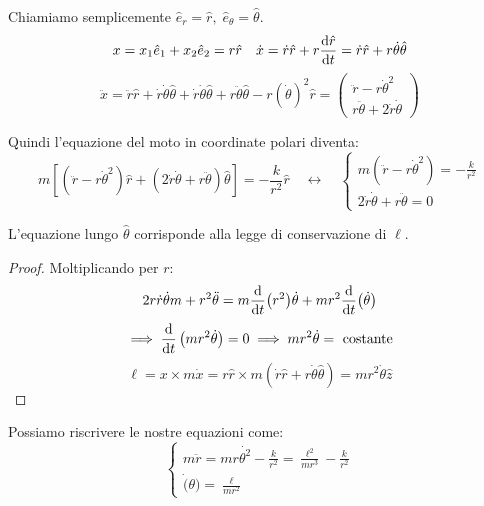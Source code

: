 Chiamiamo semplicemente $\hat{e}_r= \hat{r},\;\hat{e}_\theta=\hat{\theta}$.
\begin{equation}
    x = x_1\hat{e}_1+x_2\hat{e}_2= r\hat{r} \quad 
    \dot{x}= \dot{r}\hat{r} + r\dv{\hat{r}}{t}=  \dot{r}\hat{r} + r \dot{\theta}\hat{\theta}
\end{equation}
\begin{equation}
    \ddot{x}=\ddot{r}\hat{r}+\dot{r}\dot{\theta}\hat{\theta} + \dot{r}\dot{\theta}\hat{\theta}  + r\ddot{\theta}\hat{\theta}-r(\dot{\theta})^2\hat{r}
    =\begin{pmatrix}
        \ddot{r}-r\dot{\theta}^2\\
        r\ddot{\theta}+2\dot{r}\dot{\theta}
    \end{pmatrix}
\end{equation}

Quindi l'equazione del moto in coordinate polari diventa:
\begin{equation}
    m\left[(\ddot{r}-r\dot{\theta}^2)\hat{r}+(2\dot{r}\dot{\theta}+r\ddot{\theta})\hat{\theta}\right]= -\frac{k}{r^2}\hat{r}
    \quad\leftrightarrow \quad
    \begin{cases}
        m(\ddot{r}-r\dot{\theta}^2)=-\frac{k}{r^2}\\
        2\dot{r}\dot{\theta}+r\ddot{\theta}=0
    \end{cases}
\end{equation}

\begin{remark}
    L'equazione lungo $\hat{\theta}$ corrisponde alla legge di conservazione di $\ell$.
\end{remark}
\begin{proof}
    Moltiplicando per $r$:
    \begin{equation*}
        2r\dot{r}\dot{\theta}m + r^2\ddot{\theta}= m \dv{t}(r^2)\dot{\theta}+mr^2\dv{t}(\dot{\theta})
    \end{equation*}
    \begin{equation}
        \implies \dv{t}\left( mr^2\dot{\theta} \right)=0\implies mr^2\dot{\theta}= \text{ costante}
    \end{equation}
    \begin{equation}
        \ell= x \times m\dot{x}= r\hat{r}\times m \left( \dot{r}\hat{r}+r\dot{\theta} \hat{\theta}\right)= mr^2\dot{\theta}\hat{z}   
    \end{equation}
\end{proof}
Possiamo riscrivere le nostre equazioni come:
\begin{equation}
    \begin{cases}
        m\ddot{r}= mr\dot{\theta^2}-\frac{k}{r^2}= \frac{\ell^2}{mr^3}-\frac{k}{r^2}\\
        \dot(\theta)= \frac{\ell}{mr^2}
    \end{cases}
\end{equation}

